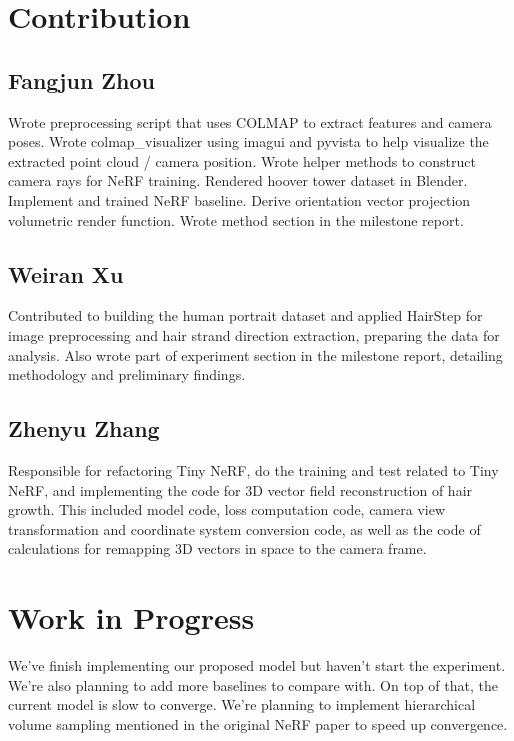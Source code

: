 \documentclass[12pt]{article}
\begin{document}
  \section{Contribution}

  \subsection{Fangjun Zhou}

  Wrote preprocessing script that uses COLMAP to extract features and camera poses. Wrote colmap\_visualizer using imagui and pyvista to help visualize the extracted point cloud / camera position. Wrote helper methods to construct camera rays for NeRF training. Rendered hoover tower dataset in Blender. Implement and trained NeRF baseline. Derive orientation vector projection volumetric render function. Wrote method section in the milestone report.

  \subsection{Weiran Xu}
  
  Contributed to building the human portrait dataset and applied HairStep for image preprocessing and hair strand direction extraction, preparing the data for analysis. Also wrote part of experiment section in the milestone report, detailing methodology and preliminary findings.

  \subsection{Zhenyu Zhang}
  
  Responsible for refactoring Tiny NeRF, do the training and test related to Tiny NeRF, and implementing the code for 3D vector field reconstruction of hair growth. This included model code, loss computation code, camera view transformation and coordinate system conversion code, as well as the code of calculations for remapping 3D vectors in space to the camera frame.
  
  \section{Work in Progress}

  We've finish implementing our proposed model but haven't start the experiment. We're also planning to add more baselines to compare with. On top of that, the current model is slow to converge. We're planning to implement hierarchical volume sampling mentioned in the original NeRF paper to speed up convergence.

  \printbibliography
\end{document}
